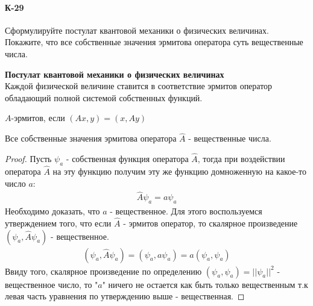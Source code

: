 \documentclass[__main__.tex]{subfiles}
\begin{document}
\paragraph{К-29}
Сформулируйте постулат квантовой механики о физических величинах. Покажите, что все собственные значения эрмитова оператора суть вещественные числа.\

\textbf{Постулат квантовой механики о физических величинах}\\
Каждой физической величине ставится в соответствие эрмитов оператор обладающий полной системой собственных функций.
\begin{definition}
	$A$-эрмитов, если $(Ax,y)=(x,Ay)$	
\end{definition}

\begin{statement}
	Все собственные значения эрмитова оператора $\hat{A}$ - вещественные числа.
\end{statement}
\begin{proof}
	Пусть $\psi_a$ - собственная функция оператора $\hat{A}$, тогда при воздействии оператора $\hat{A}$ на эту функцию получим эту же функцию домноженную на какое-то число $a$:
	\begin{gather*}
		\hat{A}\psi_a = a\psi_a
	\end{gather*}
	Необходимо доказать, что $a$ - вещественное. Для этого воспользуемся утверждением того, что если $\hat{A}$ - эрмитов оператор, то скалярное произведение $(\psi_a,\hat{A}\psi_a)$ - вещественное.
	\begin{gather*}
		(\psi_a,\hat{A}\psi_a) = (\psi_a,a\psi_a) = a(\psi_a,\psi_a)
	\end{gather*}
	Ввиду того, скалярное произведение по определению $(\psi_a,\psi_a) = \vert\vert\psi_a\vert\vert^2$ - вещественное число, то "$a$" ничего не остается как быть только вещественным т.к левая часть уравнения по утверждению выше  - вещественная.
\end{proof}
\end{document}
